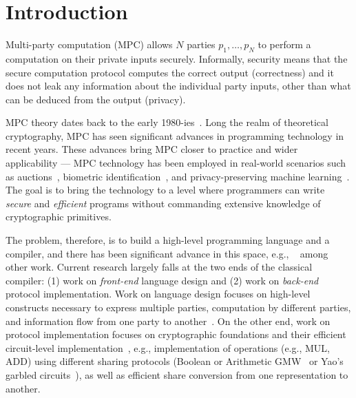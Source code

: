 \section{Introduction}
\label{sec:introduction}

Multi-party computation (MPC) allows $N$ parties $p_1,\dots, p_N$ to perform a computation on their private inputs securely. Informally, security means that the secure computation protocol computes the correct output (correctness) and it does not leak any information about the individual party inputs, other than what can be deduced from the output (privacy).


MPC theory dates back to the early 1980-ies~\cite{FOCS:Yao82b,STOC:GolMicWig87,STOC:BenGolWig88,STOC:ChaCreDam88}.
Long the realm of theoretical cryptography, MPC has seen significant advances in programming technology in recent years.
These advances bring MPC closer to practice and wider applicability ---
MPC technology has been employed in real-world scenarios such as auctions~\cite{FC:BCDGJK09}, biometric identification~\cite{ESORICS:BlaGas11},
and privacy-preserving machine learning~\cite{SP:MohZha17,CCS:MohRin18}.
The goal is to bring the technology to a level where programmers can write \emph{secure} and \emph{efficient} programs without
commanding extensive knowledge of cryptographic primitives.

The problem, therefore, is to build a high-level programming language and a compiler, and there has been significant advance in
this space, e.g., ~\cite{CCS:BenNisPin08,ESORICS:BogLauWil08,CCS:ZhaSteBla13,Hastings:2019,Keller:2020,Acay:2021,Braun:2022} among other work.
Current research largely falls at the two ends
of the classical compiler: (1) work on \emph{front-end} language design and (2) work on \emph{back-end} protocol implementation. Work on language design
focuses on high-level constructs necessary to express multiple parties, computation by different parties, and information flow from one party
to another~\cite{SP:RasHamHic14, Acay:2021}. On the other end, work on protocol implementation focuses on cryptographic foundations and their efficient circuit-level
implementation~\cite{NDSS:DemSchZoh15, CCS:ABFKLO18, Braun:2022}, e.g., implementation of operations (e.g., MUL, ADD) using different sharing protocols
(Boolean or Arithmetic GMW~\cite{STOC:GolMicWig87} or Yao's garbled circuits~\cite{FOCS:Yao82b}), as well as efficient share conversion from one representation
to another.

